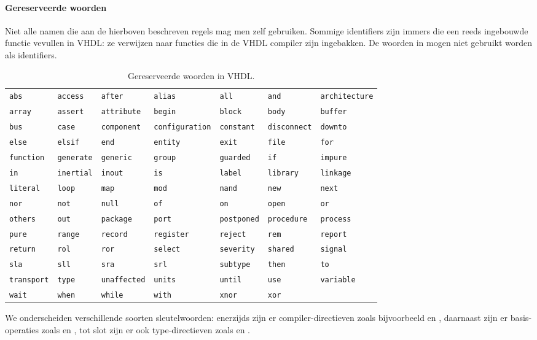 \paragraph{Gereserveerde woorden}Niet alle namen die aan de hierboven beschreven regels mag men zelf gebruiken. Sommige identifiers zijn immers  die een reeds ingebouwde functie vevullen in VHDL: ze verwijzen naar functies die in de VHDL compiler zijn ingebakken. De woorden in  mogen niet gebruikt worden als identifiers.
\begin{table}[hbt]
\centering
\small{\begin{tabular}{lllllll}
\verb+abs+&\verb+access+&\verb+after+&\verb+alias+&\verb+all+&\verb+and+&\verb+architecture+\\
\verb+array+&\verb+assert+&\verb+attribute+&\verb+begin+&\verb+block+&\verb+body+&\verb+buffer+\\
\verb+bus+&\verb+case+&\verb+component+&\verb+configuration+&\verb+constant+&\verb+disconnect+&\verb+downto+\\
\verb+else+&\verb+elsif+&\verb+end+&\verb+entity+&\verb+exit+&\verb+file+&\verb+for+\\
\verb+function+&\verb+generate+&\verb+generic+&\verb+group+&\verb+guarded+&\verb+if+&\verb+impure+\\
\verb+in+&\verb+inertial+&\verb+inout+&\verb+is+&\verb+label+&\verb+library+&\verb+linkage+\\
\verb+literal+&\verb+loop+&\verb+map+&\verb+mod+&\verb+nand+&\verb+new+&\verb+next+\\
\verb+nor+&\verb+not+&\verb+null+&\verb+of+&\verb+on+&\verb+open+&\verb+or+\\
\verb+others+&\verb+out+&\verb+package+&\verb+port+&\verb+postponed+&\verb+procedure+&\verb+process+\\
\verb+pure+&\verb+range+&\verb+record+&\verb+register+&\verb+reject+&\verb+rem+&\verb+report+\\
\verb+return+&\verb+rol+&\verb+ror+&\verb+select+&\verb+severity+&\verb+shared+&\verb+signal+\\
\verb+sla+&\verb+sll+&\verb+sra+&\verb+srl+&\verb+subtype+&\verb+then+&\verb+to+\\
\verb+transport+&\verb+type+&\verb+unaffected+&\verb+units+&\verb+until+&\verb+use+&\verb+variable+\\
\verb+wait+&\verb+when+&\verb+while+&\verb+with+&\verb+xnor+&\verb+xor+
\end{tabular}}
\caption{Gereserveerde woorden in VHDL.}
\label{tbl:vHDLReservedWords}
\end{table}
We onderscheiden verschillende soorten sleutelwoorden: enerzijds zijn er compiler-directieven zoals bijvoorbeeld  en , daarnaast zijn er basis-operaties zoals  en , tot slot zijn er ook type-directieven zoals  en .
